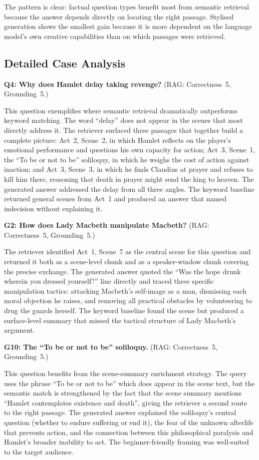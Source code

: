 \documentclass[10pt,conference]{IEEEtran}
\begin{document}
The pattern is clear: factual question types benefit most from
semantic retrieval because the answer depends directly on locating
the right passage. Stylised generation shows the smallest gain
because it is more dependent on the language model's own creative
capabilities than on which passages were retrieved.

\subsection{Detailed Case Analysis}

\medskip\noindent\textbf{Q4: Why does Hamlet delay taking revenge?}
(RAG: Correctness~5, Grounding~5.)

This question exemplifies where semantic retrieval dramatically
outperforms keyword matching. The word ``delay'' does not appear in
the scenes that most directly address it. The retriever surfaced three
passages that together build a complete picture: Act~2, Scene~2, in
which Hamlet reflects on the player's emotional performance and
questions his own capacity for action; Act~3, Scene~1, the ``To be
or not to be'' soliloquy, in which he weighs the cost of action
against inaction; and Act~3, Scene~3, in which he finds Claudius at
prayer and refuses to kill him there, reasoning that death in prayer
might send the king to heaven. The generated answer addressed the
delay from all three angles. The keyword baseline returned general
scenes from Act~1 and produced an answer that named indecision without
explaining it.

\medskip\noindent\textbf{G2: How does Lady Macbeth manipulate Macbeth?}
(RAG: Correctness~5, Grounding~5.)

The retriever identified Act~1, Scene~7 as the central scene for this
question and returned it both as a scene-level chunk and as a
speaker-window chunk covering the precise exchange. The generated
answer quoted the ``Was the hope drunk wherein you dressed yourself?''
line directly and traced three specific manipulation tactics: attacking
Macbeth's self-image as a man, dismissing each moral objection he
raises, and removing all practical obstacles by volunteering to drug
the guards herself. The keyword baseline found the scene but produced
a surface-level summary that missed the tactical structure of
Lady Macbeth's argument.

\medskip\noindent\textbf{G10: The ``To be or not to be'' soliloquy.}
(RAG: Correctness~5, Grounding~5.)

This question benefits from the scene-summary enrichment strategy.
The query uses the phrase ``To be or not to be'' which does appear
in the scene text, but the semantic match is strengthened by the
fact that the scene summary mentions ``Hamlet contemplates existence
and death'', giving the retriever a second route to the right
passage. The generated answer explained the soliloquy's central
question (whether to endure suffering or end it), the fear of the
unknown afterlife that prevents action, and the connection between
this philosophical paralysis and Hamlet's broader inability to act.
The beginner-friendly framing was well-suited to the target audience.
\end{document}
